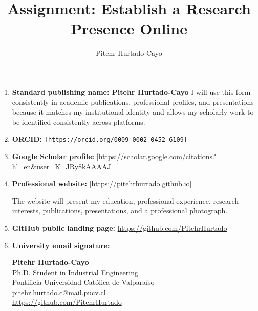 \documentclass[11pt]{article}
\title{Assignment: Establish a Research Presence Online}
\author{Pitehr Hurtado-Cayo}
\date{}
\begin{document}
\maketitle

\begin{enumerate}[leftmargin=*]
      \item \textbf{Standard publishing name: Pitehr Hurtado-Cayo} I will use this
            form consistently in academic publications, professional profiles, and
            presentations because it matches my institutional identity and allows my
            scholarly work to be identified consistently across platforms.

      \item \textbf{ORCID:} \texttt{[https://orcid.org/0009-0002-0452-6109]}

      \item \textbf{Google Scholar profile:}
            \url{[https://scholar.google.com/citations?hl=en&user=K_JRy8kAAAAJ]}

      \item \textbf{Professional website:}
            \url{[https://pitehrhurtado.github.io]}

            The website will present my education, professional experience, research
            interests, publications, presentations, and a professional photograph.

      \item \textbf{GitHub public landing page:}
            \url{https://github.com/PitehrHurtado}

      \item \textbf{University email signature:}

            \begin{flushleft}
                  \textbf{Pitehr Hurtado-Cayo}\\
                  Ph.D. Student in Industrial Engineering\\
                  Pontificia Universidad Católica de Valparaíso\\
                  \href{mailto:pitehr.hurtado.c@mail.pucv.cl}{pitehr.hurtado.c@mail.pucv.cl}\\
                  \url{https://github.com/PitehrHurtado}
            \end{flushleft}
\end{enumerate}
\end{document}
